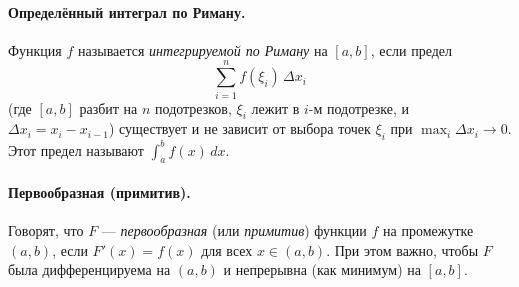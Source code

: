 
\paragraph{Определённый интеграл по Риману.}
Функция $f$ называется \emph{интегрируемой по Риману} на $[a,b]$, если предел
\[
	\sum_{i=1}^n f(\xi_i)\,\Delta x_i
\]
(где $[a,b]$ разбит на $n$ подотрезков, $\xi_i$ лежит в $i$-м подотрезке, и
$\Delta x_i=x_i - x_{i-1}$) существует и не зависит от выбора точек $\xi_i$ при
$\max_i \Delta x_i \to 0$. Этот предел называют \(\displaystyle\int_a^b f(x)\,dx\).

\paragraph{Первообразная (примитив).}
Говорят, что $F$ — \emph{первообразная} (или \emph{примитив}) функции $f$ на промежутке $(a,b)$, если $F'(x) = f(x)$ для всех $x\in(a,b)$. При этом важно, чтобы $F$ была дифференцируема на $(a,b)$ и непрерывна (как минимум) на $[a,b]$.

